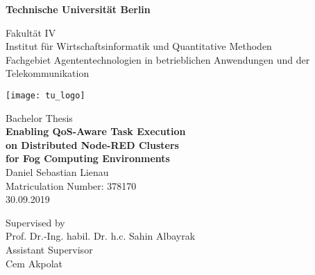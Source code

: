 \thispagestyle{empty}
\begin{center}

{\LARGE \textbf{Technische Universität Berlin}}

\vspace{0.5cm}

{\large Fakultät IV\\[1mm]}
{\large Institut für Wirtschaftsinformatik und Quantitative Methoden\\[1mm]}
{\large Fachgebiet Agententechnologien in betrieblichen Anwendungen und der Telekommunikation\\[5mm]}

\vspace*{1cm}

\texttt{[image: tu\_logo]}

\vspace*{1.0cm}

{\LARGE Bachelor Thesis}\\

\vspace{1.0cm}
{\LARGE \textbf{Enabling QoS-­Aware Task Execution}}\\
\vspace*{0.3cm}
{\LARGE \textbf{on Distributed Node­-RED Clusters}}\\
\vspace*{0.3cm}
{\LARGE \textbf{for Fog Computing Environments}}\\
\vspace*{1.0cm}
{\LARGE Daniel Sebastian Lienau}
\\
\vspace*{0.5cm}
Matriculation Number: 378170\\
30.09.2019
\vspace*{1.0cm}

Supervised by\\
Prof. Dr.-Ing. habil. Dr. h.c. Sahin Albayrak\\
\vspace*{0.5cm}
Assistant Supervisor\\
Cem Akpolat


\end{center}

